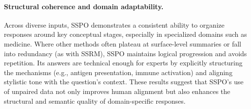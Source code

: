 \documentclass{article} %
\begin{document}
\paragraph{Structural coherence and domain adaptability.}
Across diverse inputs, SSPO demonstrates a consistent ability to organize responses around key conceptual stages, especially in specialized domains such as medicine. Where other methods often plateau at surface-level summaries or fall into redundancy (as with SSRM), SSPO maintains logical progression and avoids repetition. Its answers are technical enough for experts by explicitly structuring the mechanisms (e.g., antigen presentation, immune activation) and aligning stylistic tone with the question's context. These results suggest that SSPO's use of unpaired data not only improves human alignment but also enhances the structural and semantic quality of domain-specific responses.
\end{document}
